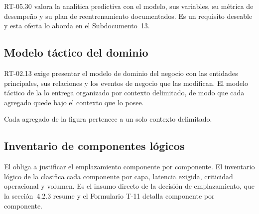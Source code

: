 RT-05.30 valora la analítica predictiva con el modelo, sus variables, su métrica de desempeño y su plan
de reentrenamiento documentados. Es un requisito deseable y esta oferta lo aborda en el
Subdocumento~13.

\subsection{Modelo táctico del dominio}\label{sec:4-tactico}

RT-02.13 exige presentar el modelo de dominio del negocio con las entidades principales, sus relaciones
y los eventos de negocio que las modifican. El modelo táctico de la  lo entrega
organizado por contexto delimitado, de modo que cada agregado quede bajo el contexto que lo posee.


Cada agregado de la figura pertenece a un solo contexto delimitado.


\subsection{Inventario de componentes lógicos}\label{sec:4-inventario}

El  obliga a justificar el emplazamiento componente por componente. El inventario lógico
de la  clasifica cada componente por capa, latencia exigida, criticidad operacional
y volumen. Es el insumo directo de la decisión de emplazamiento, que la sección~4.2.3 resume y el
Formulario T-11 detalla componente por componente.

